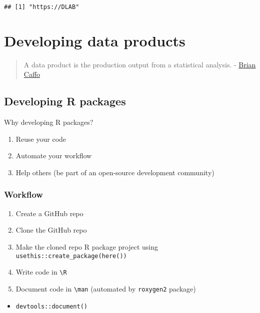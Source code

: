 \documentclass[
]{book}
\providecommand{\tightlist}{%
  \setlength{\itemsep}{0pt}\setlength{\parskip}{0pt}}
\begin{document}
\begin{verbatim}
## [1] "https://DLAB"
\end{verbatim}

\hypertarget{products}{%
\chapter{Developing data products}\label{products}}

\begin{quote}
A data product is the production output from a statistical analysis. - \href{https://sites.google.com/view/bcaffo/home}{Brian Caffo}
\end{quote}

\hypertarget{developing-r-packages}{%
\section{Developing R packages}\label{developing-r-packages}}

Why developing R packages?

\begin{enumerate}
\def\labelenumi{\arabic{enumi}.}
\tightlist
\item
  Reuse your code
\item
  Automate your workflow
\item
  Help others (be part of an open-source development community)
\end{enumerate}

\hypertarget{workflow}{%
\subsection{Workflow}\label{workflow}}

\begin{enumerate}
\def\labelenumi{\arabic{enumi}.}
\tightlist
\item
  Create a GitHub repo
\item
  Clone the GitHub repo
\item
  Make the cloned repo R package project using \texttt{usethis::create\_package(here())}
\item
  Write code in \texttt{\textbackslash{}R}
\item
  Document code in \texttt{\textbackslash{}man} (automated by \texttt{roxygen2} package)
\end{enumerate}

\begin{itemize}
\tightlist
\item
  \texttt{devtools::document()}
\end{itemize}
\end{document}
